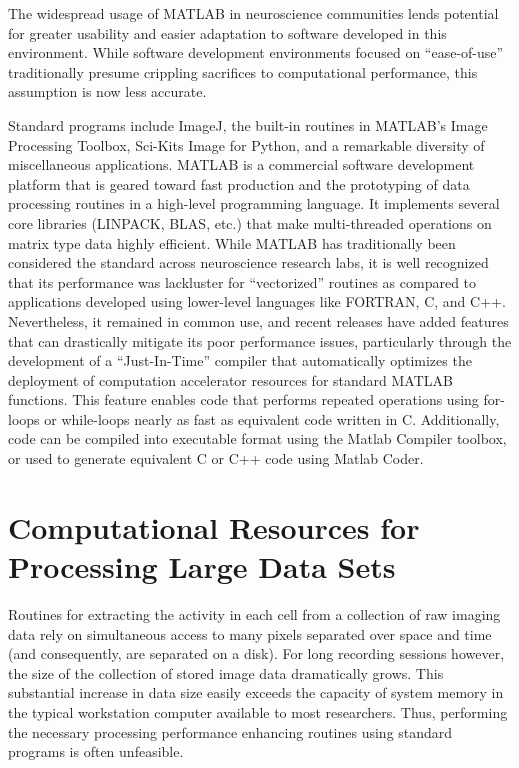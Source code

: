 \documentclass[../main.tex]{subfiles}
\begin{document}
The widespread usage of MATLAB in neuroscience communities lends potential for greater usability and easier adaptation to software developed in this environment.
While software development environments focused on ``ease-of-use'' traditionally presume crippling sacrifices to computational performance, this assumption is now less accurate.

Standard programs include ImageJ, the built-in routines in MATLAB's Image Processing Toolbox, Sci-Kits Image for Python, and a remarkable diversity of miscellaneous applications.
MATLAB is a commercial software development platform that is geared toward fast production and the prototyping of data processing routines in a high-level programming language.
It implements several core libraries (LINPACK, BLAS, etc.)
that make multi-threaded operations on matrix type data highly
efficient.
While MATLAB has traditionally been considered the standard across neuroscience research labs, it is well recognized that its performance was lackluster for ``vectorized'' routines as compared to applications developed using lower-level languages like FORTRAN, C, and C++.
Nevertheless, it remained in common use, and recent releases have added features that can drastically mitigate its poor performance issues, particularly through the development of a ``Just-In-Time'' compiler that automatically optimizes the deployment of computation accelerator resources for standard MATLAB functions.
This feature enables code that performs repeated operations using for-loops or while-loops nearly as fast as equivalent code written in C.
Additionally, code can be compiled into executable format using the Matlab Compiler toolbox, or used to generate equivalent C or C++ code using Matlab Coder.

\section{Computational Resources for Processing Large Data Sets}\label{sec:computational-resources-for-processing-large-data-sets}

Routines for extracting the activity in each cell from a collection of raw imaging data rely on simultaneous access to many pixels separated over space and time (and consequently, are separated on a disk).
For long recording sessions however, the size of the collection of stored image data dramatically grows.
This substantial increase in data size easily exceeds the capacity of system memory in the typical workstation computer available to most researchers.
Thus, performing the necessary processing performance enhancing routines using standard programs is often unfeasible.
\end{document}
